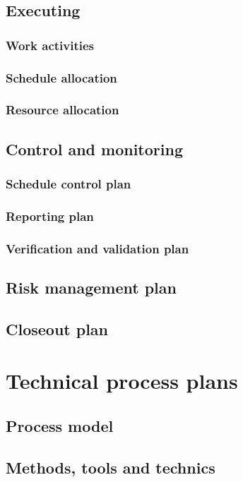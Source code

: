 \documentclass[twocolumn]{article}
\begin{document}
\subsection{Executing}
\subsubsection{Work activities}
\subsubsection{Schedule allocation}
\subsubsection{Resource allocation}

\subsection{Control and monitoring}
\subsubsection{Schedule control plan}
\subsubsection{Reporting plan}
\subsubsection{Verification and validation plan}

\subsection{Risk management plan}

\subsection{Closeout plan}

\section{Technical process plans}
\subsection{Process model}
\subsection{Methods, tools and technics}
\end{document}

